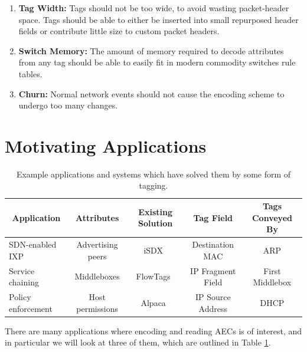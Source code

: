 \begin{enumerate}
\item \textbf{Tag Width:} Tags should not be too wide, to avoid wasting packet-header space.
Tags should be able to either be inserted into small repurposed header fields or contribute little size to custom packet headers. 
\item \textbf{Switch Memory:} The amount of memory required to decode attributes from any tag should be able to easily fit in modern commodity switches rule tables.
\item \textbf{Churn:} Normal network events should not cause the encoding scheme to undergo too many changes.
\end{enumerate}


\section{Motivating Applications}\label{sec:motivation}
\begin{table}[t]
\begin{center}
    \begin{tabular}{|l|c|c|c|c|}
    \hline
    \multicolumn{1}{|c|}{\bf Application} & 
    \multicolumn{1}{c|}{\bf Attributes} & 
    \multicolumn{1}{c|}{\bf Existing Solution} & 
    \multicolumn{1}{c|}{\bf Tag Field} & 
    \multicolumn{1}{c|}{\bf Tags Conveyed By}\\ \hline
    SDN-enabled IXP & Advertising peers & iSDX~\cite{isdx} & Destination MAC & ARP \\ \hline
    Service chaining & Middleboxes & FlowTags~\cite{flowtags} & IP Fragment Field & First Middlebox \\ \hline
    Policy enforcement & Host permissions & Alpaca~\cite{alpaca} & IP Source Address & DHCP \\ \hline
    \end{tabular}
\end{center}
    \caption{Example applications and systems which have solved them by some form of tagging.} 
    \label{tab:applications}
\end{table}

There are many applications where encoding and reading AECs is of interest, and in particular we will look at three of them, which are outlined in Table \ref{tab:applications}.
 
